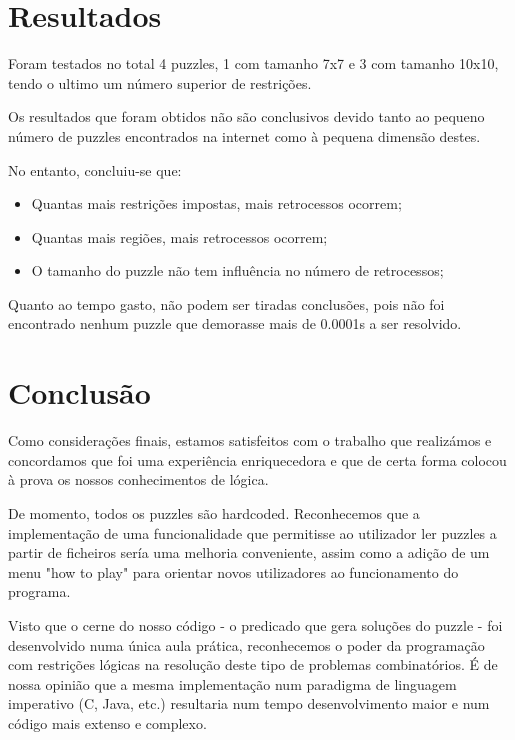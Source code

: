 \documentclass[runningheads,a4paper,12pt]{llncs}
\begin{document}
\section{Resultados}

Foram testados no total 4 puzzles, 1 com tamanho 7x7 e 3 com tamanho 10x10, tendo o ultimo um número superior de restrições.

Os resultados que foram obtidos não são conclusivos devido tanto ao pequeno número de puzzles encontrados na internet como à pequena dimensão destes.

No entanto, concluiu-se que:

\begin{itemize}
  \item Quantas mais restrições impostas, mais retrocessos ocorrem;
  \item Quantas mais regiões, mais retrocessos ocorrem;
  \item O tamanho do puzzle não tem influência no número de retrocessos;
\end{itemize}

Quanto ao tempo gasto, não podem ser tiradas conclusões, pois não foi encontrado nenhum puzzle que demorasse mais de 0.0001s a ser resolvido.



\section{Conclusão}

Como considerações finais, estamos satisfeitos com o trabalho que realizámos e concordamos que foi uma experiência enriquecedora e que de certa forma colocou à prova os nossos conhecimentos de lógica.

De momento, todos os puzzles são hardcoded. Reconhecemos que a implementação de uma funcionalidade que permitisse ao utilizador ler puzzles a partir de ficheiros sería uma melhoria conveniente, assim como a adição de um menu "how to play" para orientar novos utilizadores ao funcionamento do programa.

Visto que o cerne do nosso código - o predicado que gera soluções do puzzle - foi desenvolvido numa única aula prática, reconhecemos o poder da programação com restrições lógicas na resolução deste tipo de problemas combinatórios. É de nossa opinião que a mesma implementação num paradigma de linguagem imperativo (C, Java, etc.) resultaria num tempo desenvolvimento maior e num código mais extenso e complexo.
\end{document}
